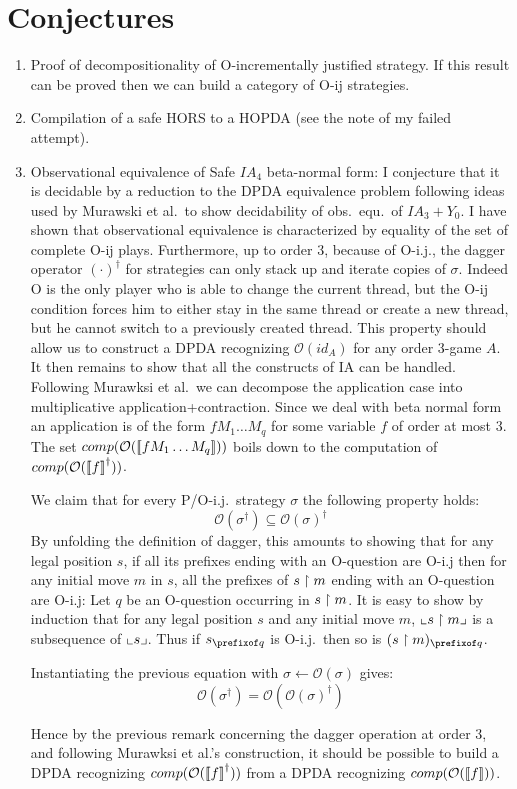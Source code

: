 \documentclass{article}
\begin{document}
\section{Conjectures}

\begin{enumerate}
  \item Proof of decompositionality of O-incrementally justified strategy. If this result can be proved then we can build a category of O-ij strategies.

  \item Compilation of a safe HORS to a HOPDA (see the note of my failed attempt).

  \item Observational equivalence of Safe $IA_4$ beta-normal form: I conjecture that it is decidable
  by a reduction to the DPDA equivalence problem following ideas used by Murawski et al.\ to show decidability of obs.\ equ.\ of $IA_3 + Y_0$.
  I have shown that observational equivalence is characterized by equality of the set of complete O-ij plays. Furthermore, up to order $3$, because of O-i.j., the dagger operator $(\cdot)^\dagger$ for strategies can only stack up and iterate copies of $\sigma$. Indeed O is the only player who is able to change the current thread, but the O-ij condition forces him to either stay in the same thread or create a new thread, but he cannot switch to a previously created thread.
  This property should allow us to construct a DPDA recognizing $\mathcal{O}(id_A)$ for any order $3$-game $A$. It then remains to show that all the constructs of IA can be handled. Following Murawksi et al.\ we can decompose the application case into multiplicative application+contraction. Since we deal with beta normal form an application is of the form $f M_1 \ldots M_q$ for some variable $f$ of order at most $3$. The set $comp(\mathcal{O}({[\![ f M_1 \ldots M_q ]\!]}))$ boils down to the computation of $comp(\mathcal{O}({[\![ f ]\!]}^\dagger))$.

  We claim that for every P/O-i.j.\ strategy $\sigma$ the following property holds:
  $$ \mathcal{O}(\sigma^\dagger) \subseteq \mathcal{O}(\sigma)^\dagger $$
  By unfolding the definition of dagger, this amounts to showing that for any legal position $s$, if all its prefixes ending with an O-question are O-i.j then for any initial move $m$ in $s$, all the prefixes of $s\upharpoonright m$ ending with an O-question are O-i.j:  Let $q$ be an O-question occurring in $s\upharpoonright m$.
  It is easy to show by induction that
  for any legal position $s$ and any initial move $m$, $\llcorner s\upharpoonright m \lrcorner$ is a subsequence of $\llcorner s \lrcorner$.
  Thus if $s_{\prefixof q}$ is O-i.j.\ then so is 
  $(s\filter m)_{\prefixof q}$.

Instantiating the previous equation with $\sigma\leftarrow \mathcal{O}(\sigma)$ gives:
  $$ \mathcal{O}(\sigma^\dagger) = \mathcal{O}(\mathcal{O}(\sigma)^\dagger) $$


  Hence by the previous remark concerning the dagger operation at order $3$, and following Murawksi et al.'s construction, it should be possible to build a DPDA recognizing $comp(\mathcal{O}({[\![ f ]\!]}^\dagger))$ from a DPDA recognizing $comp(\mathcal{O}({[\![ f ]\!]}))$.


\end{enumerate}
\end{document}

